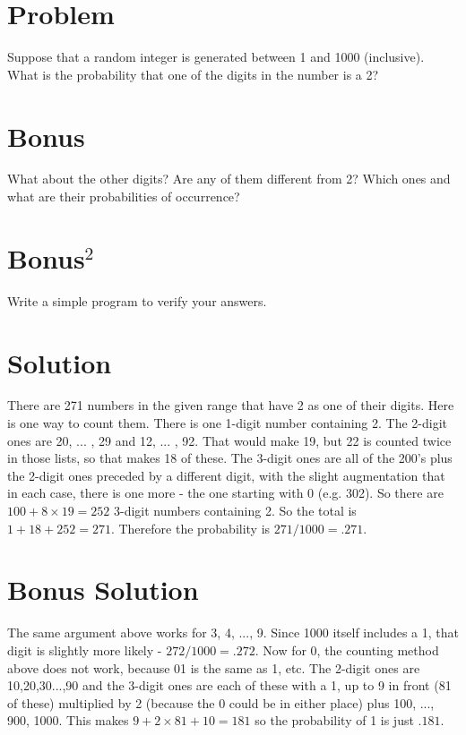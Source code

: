 \documentclass[11pt,a4paper]{report}
\theoremstyle{plain}
\theoremstyle{definition}
\theoremstyle{remark}
\begin{document}
\section*{Problem} Suppose that a random integer is generated between 1 and 1000
(inclusive).  What is the probability that one of the digits in the number is a
2?

\section*{Bonus} What about the other digits?  Are any of them different from 2?
Which ones and what are their probabilities of occurrence?

\section*{Bonus$^2$} Write a simple program to verify your answers.

\section*{Solution} There are 271 numbers in the given range that have
2 as one of their digits.  Here is one way to count them.  There is one 1-digit
number containing 2.  The 2-digit ones are 20, ... , 29 and 12, ... , 92.  That
would make 19, but 22 is counted twice in those lists, so that makes 18 of
these.  The 3-digit ones are all of the 200's plus the 2-digit ones preceded by
a different digit, with the slight augmentation that in each case, there is one
more - the one starting with 0 (e.g. 302).  So there are $100 + 8 \times 19 =
252$ 3-digit numbers containing 2.  So the total is $1 + 18 + 252 = 271.$
Therefore the probability is $271 / 1000 = .271$. \section*{Bonus Solution} The
same argument above works for 3, 4, ..., 9.  Since 1000 itself includes a 1,
that digit is slightly more likely - $272/1000 = .272.$  Now for 0, the counting
method above does not work, because 01 is the same as 1, etc.  The 2-digit ones
are 10,20,30...,90 and the 3-digit ones are each of these with a 1, up to 9 in
front (81 of these) multiplied by 2 (because the 0 could be in either place)
plus 100, ..., 900, 1000.  This makes $9 + 2 \times 81 + 10 = 181$ so the
probability of 1 is just $.181.$
\end{document}
